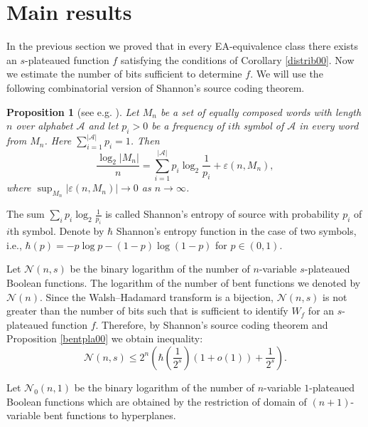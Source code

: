 \documentclass[a4paper,12pt]{article}   %
\newtheorem{proposition}{Proposition}
\begin{document}
\section{Main results}

In the previous section we proved that in every EA-equivalence class
there exists an $s$-plateaued function $f$ satisfying the conditions
of Corollary \ref{distrib00}. Now we estimate the number of bits
sufficient to determine $f$.
 We will use the following combinatorial version of Shannon's
source coding theorem.

\begin{proposition}[see e.g. \cite{Kri}]
Let $M_n$ be a set of equally composed words with length $n$ over
alphabet $\mathcal{A}$ and let $p_i>0$ be a frequency of $i$th
symbol of $\mathcal{A}$ in every word from $M_n$. Here
$\sum\limits_{i=1}^{|\mathcal{A}|}p_i=1$. Then
$$\frac{\log_2|M_n|}{n}=\sum\limits_{i=1}^{|\mathcal{A}|}p_i\log_2\frac{1}{p_i}+\varepsilon(n,M_n),$$
where  $\sup_{M_n}|\varepsilon(n,M_n)|\rightarrow 0$ as
$n\rightarrow\infty$.
\end{proposition}

The sum $\sum_ip_i\log_2\frac{1}{p_i}$ is called Shannon's entropy
of source with probability $p_i$ of $i$th symbol. Denote by $\hbar$
Shannon's entropy function in the case of two symbols, i.e.,
$\hbar(p)=-p\log p- (1-p)\log (1-p)$ for $p\in (0,1)$.





Let $\mathcal{N}(n,s)$ be the binary logarithm of the number of
$n$-variable $s$-plateaued Boolean functions. The logarithm of the
number  of bent functions we denoted by $\mathcal{N}(n)$. Since the
Walsh--Hadamard transform is a bijection, $\mathcal{N}(n,s)$ is not
greater than the number of bits such that is sufficient to identify
$W_f$ for an $s$-plateaued function $f$. Therefore, by    Shannon's
source coding  theorem and Proposition \ref{bentpla00} we obtain
inequality:
\begin{equation}\label{eqSh}
 \mathcal{N}(n,s)\leq
2^n\left(\hbar\left(\frac{1}{2^s}\right)(1+o(1))+\frac{1}{2^s}\right).
\end{equation}

Let $\mathcal{N}_0(n,1)$ be the binary logarithm of the number of
$n$-variable $1$-plateaued Boolean functions  which are obtained by
the restriction of domain of  $(n+1)$-variable bent functions to
hyperplanes.
\end{document}
